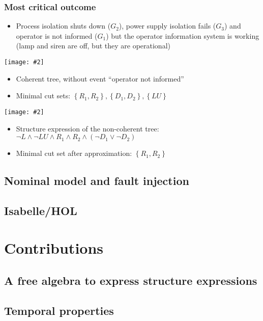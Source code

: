 \documentclass{beamer}
\newcommand{\includegraphicsaspectratio}[2][1]{%
  \texttt{[image: \#2]}%
}
\begin{document}
\begin{frame}
	\frametitle{Most critical outcome}
	\footnotesize
	\begin{itemize}
		\item Process isolation shuts down ($G_2$), power supply isolation fails ($G_3$) and operator is not informed ($G_1$) but the operator information system is working (lamp and siren are off, but they are operational)
	\end{itemize}
	\begin{minipage}{0.38\textwidth}
		\footnotesize
		\includegraphicsaspectratio[0.95]{outcome-4-coherent-ft}
		\begin{itemize}
			\item Coherent tree, without event ``operator not informed''
			\item Minimal cut sets: $\left\{R_1, R_2\right\}, \left\{D_1, D_2\right\}, \left\{LU\right\} $
		\end{itemize}
	\end{minipage}
	\begin{minipage}{0.52\textwidth}
		\footnotesize
		\includegraphicsaspectratio[0.95]{outcome-4-non-coherent-ft}
		\begin{itemize}
			\item Structure expression of the non-coherent tree: $\lnot L \land \lnot LU \land R_1 \land R_2 \land \left(\lnot D_1 \lor \lnot D_2\right)$
			\item Minimal cut set after approximation: $\left\{R_1, R_2\right\} $
		\end{itemize}
	\end{minipage}
\end{frame}

\subsection{Nominal model and fault injection}
\subsection{Isabelle/HOL}

\section{Contributions}
\subsection{A free algebra to express structure expressions}
\subsection{Temporal properties}
\end{document}
